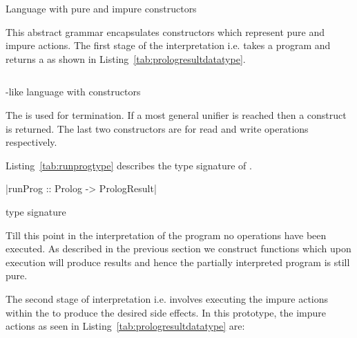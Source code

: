 \documentclass[thesis-solanki.tex]{subfiles}
\begin{document}
\begin{code-list}[H]
\begin{singlespace}
\inputminted{haskell}{haskell-proto4-prlg-lang.hs}
\end{singlespace}
\caption{Language with pure and impure constructors}
\label{tab:langwithpureandimpureconstructors}
\end{code-list}

This abstract grammar encapsulates constructors which represent pure and impure actions. The first stage of the interpretation i.e. 
 takes a program and returns a  as shown in Listing~\ref{tab:prologresultdatatype}.

\begin{code-list}[H]
\begin{singlespace}
  \inputminted[linenos, firstline=7, lastline=11]{haskell}{haskell-proto4-platen-winkel.hs}
\end{singlespace}
\caption{-like language with  constructors}
\label{tab:prologresultdatatype}
\end{code-list}

The  is used for termination. If a most general unifier is reached then a  construct is
returned. The last two constructors are for read and write operations respectively.

Listing~\ref{tab:runprogtype} describes the type signature of .
\begin{code-list}[H]
\begin{singlespace}
|runProg :: Prolog -> PrologResult| 
\end{singlespace}
\caption{ type signature}
\label{tab:runprogtype}
\end{code-list}

Till this point in the interpretation of the program no  operations have been executed. As described in the previous 
section we construct functions which upon execution will produce results and hence the partially interpreted program is still pure.

The second stage of interpretation i.e.  involves executing the impure actions within the  to produce the desired side
effects. In this prototype, the impure actions as seen in Listing~\ref{tab:prologresultdatatype} are:
\end{document}
